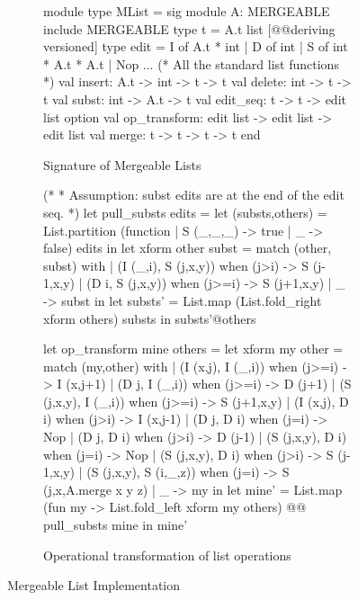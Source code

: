 \begin{figure}

\begin{subfigure}[b]{0.7\textwidth}
\begin{ocaml}
module type MList = sig
  module A: MERGEABLE
  include MERGEABLE
  type t = A.t list [@@deriving versioned]
  type edit = I of A.t * int
    | D of int
    | S of int * A.t * A.t
    | Nop
  ... (* All the standard list functions *)
  val insert: A.t -> int -> t -> t
  val delete: int -> t -> t
  val subst: int -> A.t -> t
  val edit_seq: t -> t -> edit list option
  val op_transform: edit list -> edit list -> edit list
  val merge: t -> t -> t -> t
end
\end{ocaml}
\caption{Signature of Mergeable Lists}
\label{fig:mlist-sig}
\end{subfigure}

\begin{subfigure}{0.7\textwidth}
\begin{ocaml}
(*
 * Assumption: subst edits are at the end of the edit seq.
 *)
let pull_substs edits = 
  let (substs,others) = List.partition 
                          (function | S (_,_,_) -> true
                             | _ -> false) edits in
  let xform other subst = match (other, subst)  with 
    | (I (_,i), S (j,x,y)) when (j>i) -> S (j-1,x,y)
    | (D i, S (j,x,y)) when (j>=i) ->  S (j+1,x,y)
    | _ -> subst in
  let substs' = List.map 
                  (List.fold_right xform others) substs in
    substs'@others

let op_transform mine others = 
  let xform my other = match (my,other)  with 
    | (I (x,j), I (_,i)) when (j>=i) -> I (x,j+1)
    | (D j, I (_,i)) when (j>=i) -> D (j+1)
    | (S (j,x,y), I (_,i)) when (j>=i) -> S (j+1,x,y)
    | (I (x,j), D i) when (j>i) ->  I (x,j-1)
    | (D j, D i) when (j=i) ->  Nop
    | (D j, D i) when (j>i) ->  D (j-1)
    | (S (j,x,y), D i) when (j=i) -> Nop
    | (S (j,x,y), D i) when (j>i) -> S (j-1,x,y)
    | (S (j,x,y), S (i,_,z)) when (j=i) -> S (j,x,A.merge x y z) 
    | _ -> my in
  let mine' = List.map (fun my -> List.fold_left 
                            xform my others) @@ pull_substs mine in
    mine'
\end{ocaml}
\caption{Operational transformation of list operations}
\label{fig:mlist-xform}
\end{subfigure}

\caption{Mergeable List Implementation}
\label{fig:mlist}
\end{figure}
